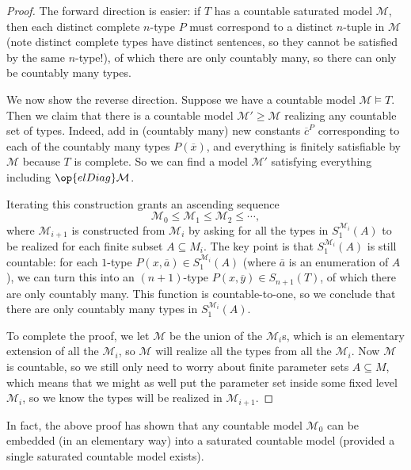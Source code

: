 \documentclass[../notes.tex]{subfiles}
\begin{document}
\begin{proof}
	The forward direction is easier: if $T$ has a countable saturated model $\mathcal M$, then each distinct complete $n$-type $P$ must correspond to a distinct $n$-tuple in $\mathcal M$ (note distinct complete types have distinct sentences, so they cannot be satisfied by the same $n$-type!), of which there are only countably many, so there can only be countably many types.

	We now show the reverse direction. Suppose we have a countable model $\mathcal M\models T$. Then we claim that there is a countable model $\mathcal M'\ge\mathcal M$ realizing any countable set of types. Indeed, add in (countably many) new constants $\overline c^P$ corresponding to each of the countably many types $P(\overline x)$, and everything is finitely satisfiable by $\mathcal M$ because $T$ is complete. So we can find a model $\mathcal M'$ satisfying everything including $\op{elDiag}\mathcal M$.

	Iterating this construction grants an ascending sequence
	\[\mathcal M_0\le\mathcal M_1\le\mathcal M_2\le\cdots,\]
	where $\mathcal M_{i+1}$ is constructed from $\mathcal M_i$ by asking for all the types in $S_1^{\mathcal M_i}(A)$ to be realized for each finite subset $A\subseteq M_i$. The key point is that $S_1^{\mathcal M_i}(A)$ is still countable: for each $1$-type $P(x,\overline a)\in S_1^{\mathcal M_i}(A)$ (where $\overline a$ is an enumeration of $A$), we can turn this into an $(n+1)$-type $P(x,\overline y)\in S_{n+1}(T)$, of which there are only countably many. This function is countable-to-one, so we conclude that there are only countably many types in $S_1^{\mathcal M_i}(A)$.

	To complete the proof, we let $\mathcal M$ be the union of the $\mathcal M_i$s, which is an elementary extension of all the $\mathcal M_i$, so $\mathcal M$ will realize all the types from all the $\mathcal M_i$. Now $\mathcal M$ is countable, so we still only need to worry about finite parameter sets $A\subseteq M$, which means that we might as well put the parameter set inside some fixed level $\mathcal M_i$, so we know the types will be realized in $\mathcal M_{i+1}$.
\end{proof}
\begin{remark}
	In fact, the above proof has shown that any countable model $\mathcal M_0$ can be embedded (in an elementary way) into a saturated countable model (provided a single saturated countable model exists).
\end{remark}
\end{document}
